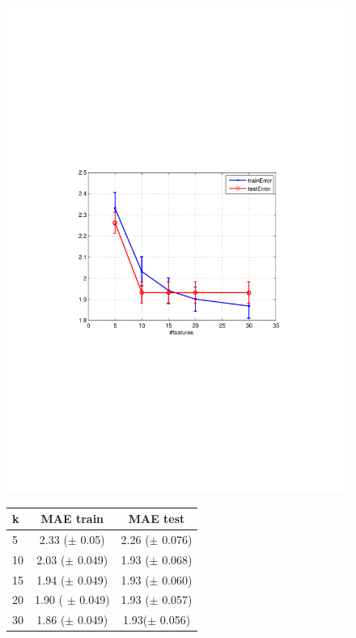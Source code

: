 \begin{figure}[h]
\begin{minipage}{\textwidth}
  \begin{minipage}[b]{0.45\textwidth}
    \centering
    \includegraphics[clip, trim=4cm 9.2cm 3.5cm 9cm, width=\textwidth]{figures/KNN_kvalue.pdf}
  \end{minipage}
  \hfill
  \begin{minipage}[b]{0.5\textwidth}
  \begin{center}
  \begin{tabular}{ |l | c | c| }
    \hline
     k & MAE train & MAE test \\ \hline
     5   & 2.33 ($\pm$  0.05) &  2.26 ($\pm$  0.076) \\ \hline
     10  &  2.03 ($\pm$  0.049) &  1.93 ($\pm$  0.068) \\ \hline
     15     &  1.94 ($\pm$ 0.049)  & 1.93 ($\pm$ 0.060) \\ \hline
     20    & 1.90  ( $\pm$ 0.049) & 1.93 ($\pm$ 0.057)\\ \hline
     30     & 1.86 ($\pm$ 0.049) & 1.93($\pm$  0.056)\\ \hline
  \end{tabular}
\end{center}
\vspace{10 mm}
    \end{minipage}
    

\end{minipage}
\end{figure}

